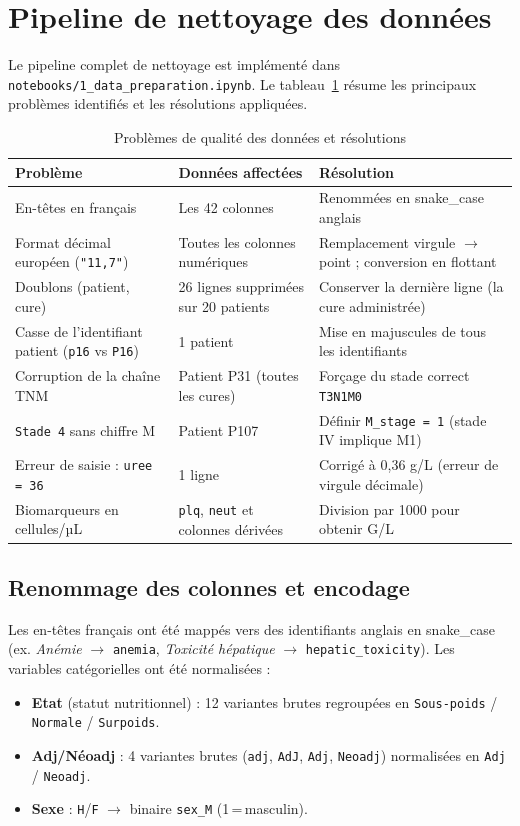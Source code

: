 \documentclass[12pt,a4paper]{report}
\begin{document}
\section{Pipeline de nettoyage des données}

Le pipeline complet de nettoyage est implémenté dans \texttt{notebooks/1\_data\_preparation.ipynb}. Le tableau~\ref{tab:cleaning} résume les principaux problèmes identifiés et les résolutions appliquées.

\begin{table}[H]
\centering
\caption{Problèmes de qualité des données et résolutions}
\label{tab:cleaning}
\begin{tabular}{p{4cm}p{5cm}p{5cm}}
\toprule
\textbf{Problème} & \textbf{Données affectées} & \textbf{Résolution} \\
\midrule
En-têtes en français & Les 42 colonnes & Renommées en snake\_case anglais \\
Format décimal européen (\texttt{"11,7"}) & Toutes les colonnes numériques & Remplacement virgule $\to$ point ; conversion en flottant \\
Doublons (patient, cure) & 26 lignes supprimées sur 20 patients & Conserver la dernière ligne (la cure administrée) \\
Casse de l'identifiant patient (\texttt{p16} vs \texttt{P16}) & 1 patient & Mise en majuscules de tous les identifiants \\
Corruption de la chaîne TNM & Patient P31 (toutes les cures) & Forçage du stade correct \texttt{T3N1M0} \\
\texttt{Stade 4} sans chiffre M & Patient P107 & Définir \texttt{M\_stage = 1} (stade IV implique M1) \\
Erreur de saisie : \texttt{uree = 36} & 1 ligne & Corrigé à 0,36 g/L (erreur de virgule décimale) \\
Biomarqueurs en cellules/µL & \texttt{plq}, \texttt{neut} et colonnes dérivées & Division par 1000 pour obtenir G/L \\
\bottomrule
\end{tabular}
\end{table}

\subsection{Renommage des colonnes et encodage}

Les en-têtes français ont été mappés vers des identifiants anglais en snake\_case (ex. \textit{Anémie} $\to$ \texttt{anemia}, \textit{Toxicité hépatique} $\to$ \texttt{hepatic\_toxicity}). Les variables catégorielles ont été normalisées :
\begin{itemize}
  \item \textbf{Etat} (statut nutritionnel) : 12 variantes brutes regroupées en \texttt{Sous-poids} / \texttt{Normale} / \texttt{Surpoids}.
  \item \textbf{Adj/Néoadj} : 4 variantes brutes (\texttt{adj}, \texttt{AdJ}, \texttt{Adj}, \texttt{Neoadj}) normalisées en \texttt{Adj} / \texttt{Neoadj}.
  \item \textbf{Sexe} : \texttt{H}/\texttt{F} $\to$ binaire \texttt{sex\_M} (1\,=\,masculin).
\end{itemize}
\end{document}

